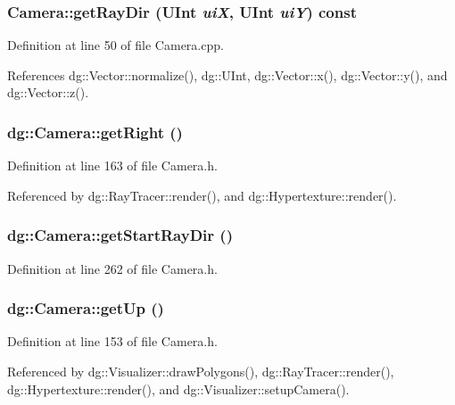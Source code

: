 \subsubsection{ Camera::get\-Ray\-Dir ({\bf UInt} {\em ui\-X}, {\bf UInt} {\em ui\-Y}) const}\label{classdg_1_1Camera_a25}




Definition at line 50 of file Camera.cpp.

References dg::Vector::normalize(), dg::UInt, dg::Vector::x(), dg::Vector::y(), and dg::Vector::z().
\subsubsection{ dg::Camera::get\-Right ()\hspace{0.3cm}{\tt  [inline]}}\label{classdg_1_1Camera_a9}




Definition at line 163 of file Camera.h.

Referenced by dg::Ray\-Tracer::render(), and dg::Hypertexture::render().
\subsubsection{ dg::Camera::get\-Start\-Ray\-Dir ()\hspace{0.3cm}{\tt  [inline]}}\label{classdg_1_1Camera_a26}




Definition at line 262 of file Camera.h.
\subsubsection{ dg::Camera::get\-Up ()\hspace{0.3cm}{\tt  [inline]}}\label{classdg_1_1Camera_a7}




Definition at line 153 of file Camera.h.

Referenced by dg::Visualizer::draw\-Polygons(), dg::Ray\-Tracer::render(), dg::Hypertexture::render(), and dg::Visualizer::setup\-Camera().
